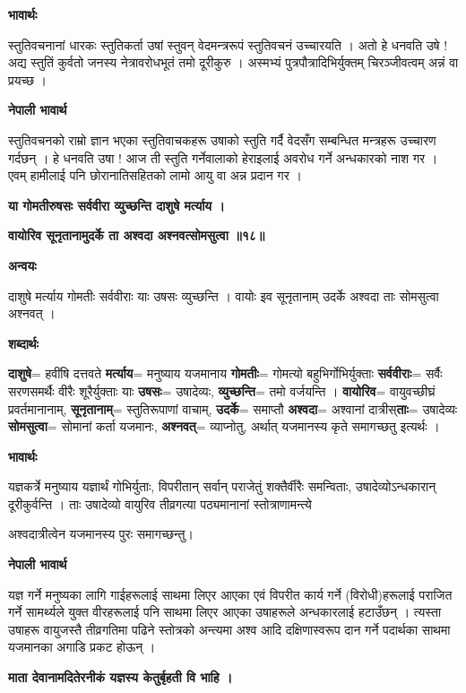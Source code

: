 \documentclass[11pt, a5paper]{article}
\begin{document}
\textbf{भावार्थः}

स्तुतिवचनानां धारकः स्तुतिकर्ता उषां स्तुवन् वेदमन्त्ररूपं स्तुतिवचनं उच्चारयति । अतो हे धनवति उषे ! अद्य स्तुतिं कुर्वतो जनस्य नेत्रावरोधभूतं तमो दूरीकुरु । अस्मभ्यं पुत्रपौत्रादिभिर्युक्तम् चिरञ्जीवत्वम् अन्नं वा प्रयच्छ ।

\textbf{नेपाली भावार्थ}

स्तुतिवचनको राम्रो ज्ञान भएका स्तुतिवाचकहरू उषाको स्तुति गर्दै वेदसँग सम्बन्धित मन्त्रहरू उच्चारण गर्दछन् । हे धनवति उषा ! आज ती स्तुति गर्नेवालाको हेराइलाई अवरोध गर्ने अन्धकारको नाश गर । एवम् हामीलाई पनि छोरानातिसहितको लामो आयु वा अन्न प्रदान गर ।

\textbf{या गोमतीरुषसः सर्ववीरा व्युच्छन्ति दाशुषे मर्त्याय ।}

\textbf{वायोरिव सूनृतानामुदर्के ता अश्वदा अश्नवत्सोमसुत्वा ॥१८॥}

\textbf{अन्वयः}

दाशुषे मर्त्याय गोमतीः सर्ववीराः याः उषसः व्युच्छन्ति । वायोः इव सूनृतानाम् उदर्के अश्वदा ताः सोमसुत्वा अश्नवत् ।

\textbf{शब्दार्थः}

\textbf{दाशुषे}= हवींषि दत्तवते \textbf{मर्त्याय}= मनुष्याय यजमानाय \textbf{गोमतीः}= गोमत्यो बहुभिर्गोभिर्युक्ताः \textbf{सर्ववीराः}= सर्वैः सरणसमर्थैः वीरैः शूरैर्युक्ताः याः \textbf{उषसः}= उषादेव्यः, \textbf{व्युच्छन्ति}= तमो वर्जयन्ति । \textbf{वायोरिव}= वायुवच्छीघ्रं प्रवर्तमानानाम्, \textbf{सूनृतानाम्}= स्तुतिरूपाणां वाचाम्, \textbf{उदर्के}= समाप्तौ \textbf{अश्वदा}= अश्वानां दात्रीस्\textbf{ताः}= उषादेव्यः \textbf{सोमसुत्वा}= सोमानां कर्ता यजमानः, \textbf{अश्नवत्}= व्याप्नोतु, अर्थात् यजमानस्य कृते समागच्छतु इत्यर्थः ।

\textbf{भावार्थः}

यज्ञकर्त्रे मनुष्याय यज्ञार्थं गोभिर्युताः, विपरीतान् सर्वान् पराजेतुं शक्तैर्वीरैः समन्विताः, उषादेव्योऽन्धकारान् दूरीकुर्वन्ति । ताः उषादेव्यो वायुरिव तीव्रगत्या पठ्यमानानां स्तोत्राणामन्त्ये

अश्वदात्रीत्वेन यजमानस्य पुरः समागच्छन्तु।

\textbf{नेपाली भावार्थ}

यज्ञ गर्ने मनुष्यका लागि गाईहरूलाई साथमा लिएर आएका एवं विपरीत कार्य गर्ने (विरोधी)हरूलाई पराजित गर्ने सामर्थ्यले युक्त वीरहरूलाई पनि साथमा लिएर आएका उषाहरूले अन्धकारलाई हटाउँछन् । त्यस्ता उषाहरू वायुजस्तै तीव्रगतिमा पढिने स्तोत्रको अन्त्यमा अश्व आदि दक्षिणास्वरूप दान गर्ने पदार्थका साथमा यजमानका अगाडि प्रकट होऊन् ।

\textbf{माता देवानामदितेरनीकं यज्ञस्य केतुर्बृहती वि भाहि ।}
\end{document}
